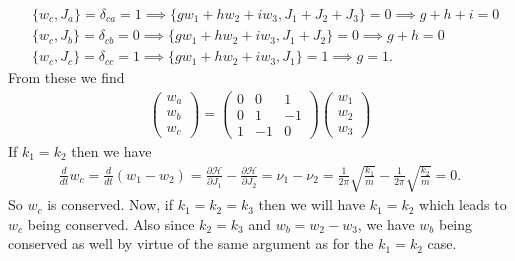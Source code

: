 \documentclass{article}
\theoremstyle{definition}
\newcommand{\p}{\partial}
\newcommand{\ham}{\mathcal{H}}
\newcommand{\w}{\omega}
\newcommand{\f}[2]{\frac{#1}{#2}}
\begin{document}
\begin{enumerate}[label=(\alph*)]
\begin{align*}
	&\{w_c, J_a\} = \delta_{ca} = 1 \implies \{gw_1+ hw_2 + iw_3 , J_1+J_2+J_3\} = 0 \implies g+h+i = 0\\
	&\{w_c, J_b\} = \delta_{cb} = 0 \implies \{gw_1+ hw_2 + iw_3 , J_1+J_2\} = 0 \implies g+h = 0\\
	&\{w_c, J_c\} = \delta_{cc} = 1 \implies \{gw_1+ hw_2 + iw_3 , J_1\} = 1 \implies g = 1.
	\end{align*}
	From these we find
	\begin{align*}
	\boxed{\begin{pmatrix}
	w_a \\ w_b \\ w_c
	\end{pmatrix}
	= \begin{pmatrix}
	0&0&1\\0&1&-1\\1&-1&0
	\end{pmatrix}
	\begin{pmatrix}
	w_1\\w_2\\w_3
	\end{pmatrix}}
	\end{align*}
	If $k_1=k_2$ then we have
	\begin{align*}
	\f{d}{dt}w_c = \f{d}{dt}(w_1 - w_2) = \f{\p \ham}{\p J_1} - \f{\p \ham}{\p J_2} = \nu_1- \nu_2 = \f{1}{2\pi}\sqrt{\f{k_1}{m}} - \f{1}{2\pi}\sqrt{\f{k_2}{m}} = 0.
	\end{align*}
	So $w_c$ is conserved. Now, if $k_1=k_2=k_3$ then we will have $k_1 = k_2$ which leads to $w_c$ being conserved. Also since $k_2 =k_3$ and $w_b = w_2 - w_3$, we have $w_b$ being conserved as well by virtue of the same argument as for the $k_1=k_2$ case.  
	
	
\end{enumerate}
\end{document}
